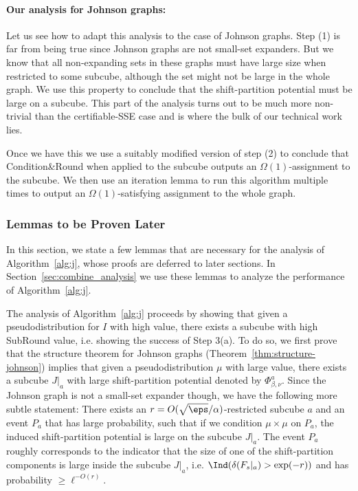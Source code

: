 \paragraph{Our analysis for Johnson graphs:} 
Let us see how to adapt this analysis to the case of Johnson graphs. Step (1) is far from being true since Johnson graphs are not small-set expanders. But we know that all non-expanding sets in these graphs must have large size when restricted to some subcube, although the set might not be large in the whole graph. We use this property to conclude that the shift-partition potential must be large on a subcube. This part of the analysis turns out to be much more non-trivial than the certifiable-SSE case and is where the bulk of our technical work lies. 

Once we have this we use a suitably modified version of step (2) to conclude that Condition\&Round when applied to the subcube outputs an $\Omega(1)$-assignment to the subcube. We then use an iteration lemma to run this algorithm multiple times to output an $\Omega(1)$-satisfying assignment to the whole graph. 




\subsubsection{Lemmas to be Proven Later}
In this section, we state a few lemmas that are necessary for the analysis of 
Algorithm~\ref{alg:j}, whose proofs are deferred to later sections. In Section~\ref{sec:combine_analysis} we 
use these lemmas to analyze the performance 
of Algorithm~\ref{alg:j}.
\skipi

The analysis of Algorithm~\ref{alg:j} proceeds by showing that given a pseudodistribution for $I$ with high value, there exists a subcube with high SubRound value, i.e. showing the success of Step 3(a). To do so, we first prove that the structure theorem for Johnson graphs (Theorem~\ref{thm:structure-johnson}) implies that given a pseudodistribution $\mu$ with large value, there exists a subcube $J|_a$ with large shift-partition potential denoted by $\Phi^a_{\beta,\nu}$. Since the Johnson graph is not a small-set expander though, we have the following more subtle statement: There exists an $r = O(\sqrt{\eps}/\alpha)$-restricted subcube $a$ and an event $P_a$ that has large probability, such that if we condition $\mu \times \mu$ on $P_a$, the induced shift-partition potential is large on the subcube $J|_a$. The event $P_a$ roughly corresponds to the indicator that the size of one of the shift-partition components is large inside the subcube $J|_a$, i.e. $\Ind(\delta(F_s|_a) > \exp(-r))$ and has probability $\geq \ell^{-O(r)}$.  



